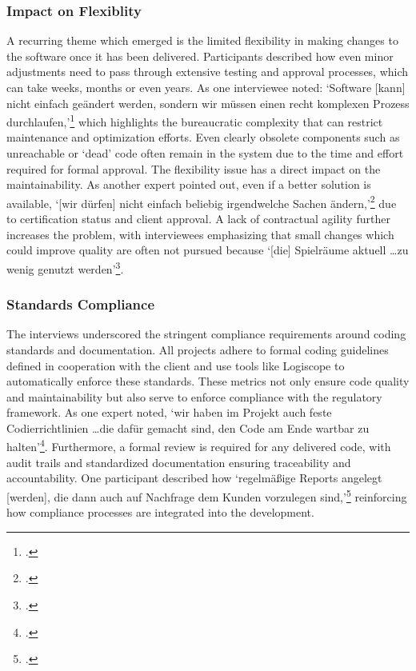 \subsubsection{Impact on Flexiblity}
A recurring theme which emerged is the limited flexibility in making changes to the software once it has been delivered. Participants described how even minor adjustments need to pass through extensive testing and approval processes, which can take weeks, months or even years.
As one interviewee noted: `Software [kann] nicht einfach geändert werden, sondern wir müssen einen recht komplexen Prozess durchlaufen,'\footcite{Interview22025} which highlights the bureaucratic complexity that can restrict maintenance and optimization efforts. Even clearly obsolete components such as unreachable or `dead' code
often remain in the system due to the time and effort required for formal approval.
The flexibility issue has a direct impact on the maintainability. As another expert pointed out, even if a better solution is available, `[wir dürfen] nicht einfach beliebig irgendwelche Sachen ändern,'\footcite{Interview32025} due to certification status and client approval. A lack of contractual agility further increases the problem,
with interviewees emphasizing that small changes which could improve quality are often not pursued because `[die] Spielräume aktuell \ldots zu wenig genutzt werden'\footcite{Interview32025}.

\subsubsection{Standards Compliance}
The interviews underscored the stringent compliance requirements around coding standards and documentation. All projects adhere to formal coding guidelines defined in cooperation with the client and use tools like Logiscope to automatically enforce these standards.
These metrics not only ensure code quality and maintainability but also serve to enforce compliance with the regulatory framework. As one expert noted, `wir haben im Projekt auch feste Codierrichtlinien \ldots die dafür gemacht sind, den Code am Ende wartbar zu halten'\footcite{Interview22025}.
Furthermore, a formal review is required for any delivered code, with audit trails and standardized documentation ensuring traceability and accountability. One participant described how `regelmäßige Reports angelegt [werden], die dann auch auf Nachfrage dem Kunden vorzulegen sind,'\footcite{Interview22025} reinforcing how compliance processes are integrated into the development.

